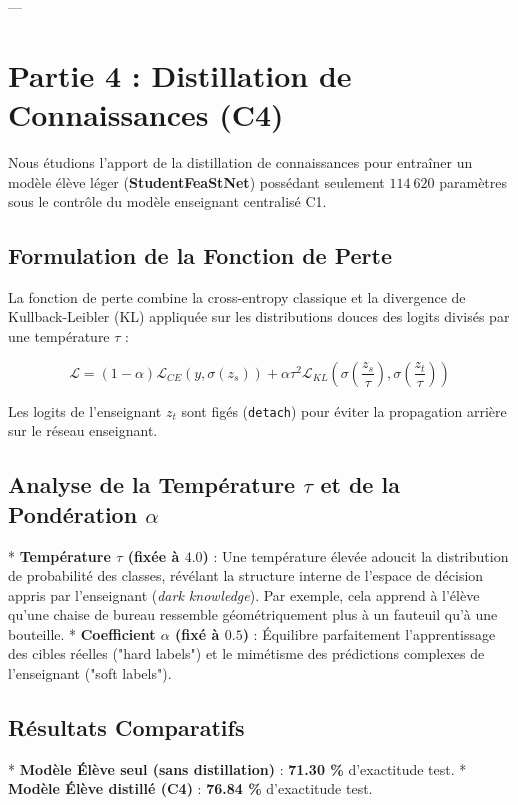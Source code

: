 \documentclass[11pt,a4paper]{article}
\begin{document}
---

\section{Partie 4 : Distillation de Connaissances (C4)}
Nous étudions l'apport de la distillation de connaissances pour entraîner un modèle élève léger (\textbf{StudentFeaStNet}) possédant seulement $114\ 620$ paramètres sous le contrôle du modèle enseignant centralisé C1.

\subsection{Formulation de la Fonction de Perte}
La fonction de perte combine la cross-entropy classique et la divergence de Kullback-Leibler (KL) appliquée sur les distributions douces des logits divisés par une température $\tau$ :

\begin{equation}
\mathcal{L} = (1 - \alpha) \mathcal{L}_{CE}(y, \sigma(z_s)) + \alpha \tau^2 \mathcal{L}_{KL}\left(\sigma\left(\frac{z_s}{\tau}\right), \sigma\left(\frac{z_t}{\tau}\right)\right)
\end{equation}

Les logits de l'enseignant $z_t$ sont figés (\texttt{detach}) pour éviter la propagation arrière sur le réseau enseignant.

\subsection{Analyse de la Température $\tau$ et de la Pondération $\alpha$}
*   \textbf{Température $\tau$ (fixée à $4.0$)} : Une température élevée adoucit la distribution de probabilité des classes, révélant la structure interne de l'espace de décision appris par l'enseignant (\textit{dark knowledge}). Par exemple, cela apprend à l'élève qu'une chaise de bureau ressemble géométriquement plus à un fauteuil qu'à une bouteille.
*   \textbf{Coefficient $\alpha$ (fixé à $0.5$)} : Équilibre parfaitement l'apprentissage des cibles réelles ("hard labels") et le mimétisme des prédictions complexes de l'enseignant ("soft labels").

\subsection{Résultats Comparatifs}
*   \textbf{Modèle Élève seul (sans distillation)} : \textbf{71.30 \%} d'exactitude test.
*   \textbf{Modèle Élève distillé (C4)} : \textbf{76.84 \%} d'exactitude test.
\end{document}
